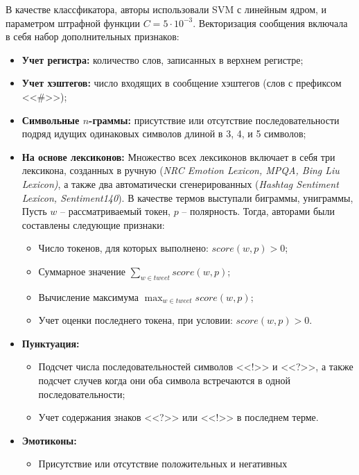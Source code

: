     В качестве классфикатора, авторы использовали SVM с линейным ядром, и
    параметром штрафной функции $C = 5\cdot 10^{-3}$.
    Векторизация сообщения включала в себя набор дополнительных признаков:
    \begin{itemize}
        \item {\bf Учет регистра:} количество слов, записанных в верхнем регистре;
        \item {\bf Учет хэштегов:} число входящих в сообщение хэштегов (слов с префиксом <<\#>>);
        \item {\bf Символьные $n$-граммы:} присутствие или отсутствие последовательности
            подряд идущих одинаковых символов длиной в 3, 4, и 5 символов;
        \item {\bf На основе лексиконов:}
            Множество всех лексиконов включает в себя три лексикона, созданных
            в ручную ({\it NRC Emotion Lexicon, MPQA, Bing Liu Lexicon)}, а также
            два автоматически сгенерированных ({\it Hashtag Sentiment Lexicon,
            Sentiment140}). В качестве термов выступали биграммы, униграммы,
            Пусть $w$ -- рассматриваемый токен, $p$ -- полярность. Тогда,
            авторами были составлены следующие признаки:%
            \begin{itemize}
                \item Число токенов, для которых выполнено: $score(w, p) > 0$;
                \item Суммарное значение $\sum_{w \in tweet} score(w,p)$;
                \item Вычисление максимума $\max_{w \in tweet} score(w,p)$;
                \item Учет оценки последнего токена, при условии: $score(w,p) > 0$.
            \end{itemize}
        \item {\bf Пунктуация:}
            \begin{itemize}
                \item Подсчет числа последовательностей символов <<!>> и <<?>>,
                    а также подсчет случев когда они оба символа встречаются в одной последовательности;
                \item Учет содержания знаков <<?>> или <<!>> в последнем терме.
            \end{itemize}
        \item {\bf Эмотиконы:}
            \begin{itemize}
                \item Присутствие или отсутствие положительных и негативных

\end{itemize}
\end{itemize}
